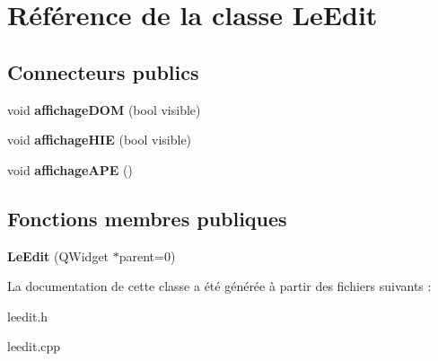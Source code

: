 \hypertarget{classLeEdit}{\section{\-Référence de la classe \-Le\-Edit}
\label{classLeEdit}
}
\subsection*{\-Connecteurs publics}
\begin{DoxyCompactItemize}
\item 
\hypertarget{classLeEdit_a093399eb39cfb60f825ecbc6ab5ae096}{void {\bfseries affichage\-D\-O\-M} (bool visible)}\label{classLeEdit_a093399eb39cfb60f825ecbc6ab5ae096}

\item 
\hypertarget{classLeEdit_ad4ae5c310f20d825dc582f8370f9069d}{void {\bfseries affichage\-H\-I\-E} (bool visible)}\label{classLeEdit_ad4ae5c310f20d825dc582f8370f9069d}

\item 
\hypertarget{classLeEdit_afa90a24cb83a1302a4ed9dd249e996b1}{void {\bfseries affichage\-A\-P\-E} ()}\label{classLeEdit_afa90a24cb83a1302a4ed9dd249e996b1}

\end{DoxyCompactItemize}
\subsection*{\-Fonctions membres publiques}
\begin{DoxyCompactItemize}
\item 
\hypertarget{classLeEdit_a135617402621e814b450a731e96e02fc}{{\bfseries \-Le\-Edit} (\-Q\-Widget $\ast$parent=0)}\label{classLeEdit_a135617402621e814b450a731e96e02fc}

\end{DoxyCompactItemize}


\-La documentation de cette classe a été générée à partir des fichiers suivants \-:\begin{DoxyCompactItemize}
\item 
leedit.\-h\item 
leedit.\-cpp\end{DoxyCompactItemize}
